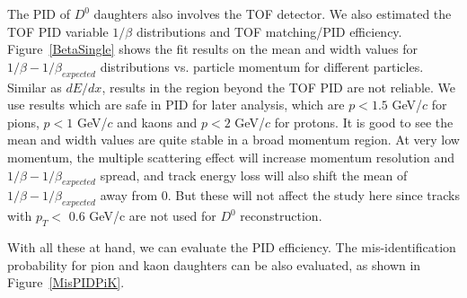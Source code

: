 The PID of $D^0$ daughters also involves the TOF detector. We also estimated the TOF PID variable $1/\beta$ distributions and TOF matching/PID efficiency. Figure~\ref{BetaSingle} shows the fit results on the mean and width values for $1/\beta-1/\beta_{expected}$ distributions vs. particle momentum for different particles. Similar as $dE/dx$, results in the region beyond the TOF PID are not reliable. We use results which are safe in PID for later analysis, which are $p<1.5$ GeV/$c$ for pions, $p<1$ GeV/$c$ and kaons and $p<2$ GeV/$c$ for protons. It is good to see the mean and width values are quite stable in a broad momentum region. At very low momentum, the multiple scattering effect will increase momentum resolution and $1/\beta-1/\beta_{expected}$ spread, and track energy loss will also shift the mean of $1/\beta-1/\beta_{expected}$ away from 0. But these will not affect the study here since tracks with $p_T < $ 0.6 GeV/c are not used for $D^0$ reconstruction. 

\begin{figure}
\end{figure}

With all these at hand, we can evaluate the PID efficiency. The mis-identification probability for pion and kaon daughters can be also evaluated, as shown in Figure~\ref{MisPIDPiK}. 

\begin{figure}
\end{figure}


